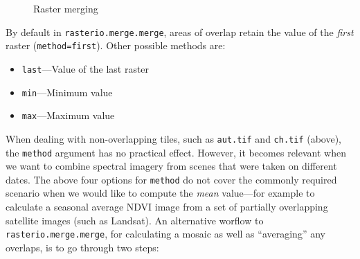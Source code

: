 \documentclass[
  letterpaper,
]{krantz}
\providecommand{\tightlist}{%
  \setlength{\itemsep}{0pt}\setlength{\parskip}{0pt}}\usepackage{longtable,booktabs,array}
\begin{document}
\begin{figure}

\begin{minipage}{0.33\linewidth}



\end{minipage}%
%
\begin{minipage}{0.33\linewidth}



\end{minipage}%
%
\begin{minipage}{0.33\linewidth}



\end{minipage}%

\caption{\label{fig-raster-merge}Raster merging}

\end{figure}%

By default in \texttt{rasterio.merge.merge}, areas of overlap retain the
value of the \emph{first} raster
(\texttt{method=\textquotesingle{}first\textquotesingle{}}). Other
possible methods are:

\begin{itemize}
\tightlist
\item
  \texttt{\textquotesingle{}last\textquotesingle{}}---Value of the last
  raster
\item
  \texttt{\textquotesingle{}min\textquotesingle{}}---Minimum value
\item
  \texttt{\textquotesingle{}max\textquotesingle{}}---Maximum value
\end{itemize}

When dealing with non-overlapping tiles, such as \texttt{aut.tif} and
\texttt{ch.tif} (above), the \texttt{method} argument has no practical
effect. However, it becomes relevant when we want to combine spectral
imagery from scenes that were taken on different dates. The above four
options for \texttt{method} do not cover the commonly required scenario
when we would like to compute the \emph{mean} value---for example to
calculate a seasonal average NDVI image from a set of partially
overlapping satellite images (such as Landsat). An alternative worflow
to \texttt{rasterio.merge.merge}, for calculating a mosaic as well as
``averaging'' any overlaps, is to go through two steps:
\end{document}
